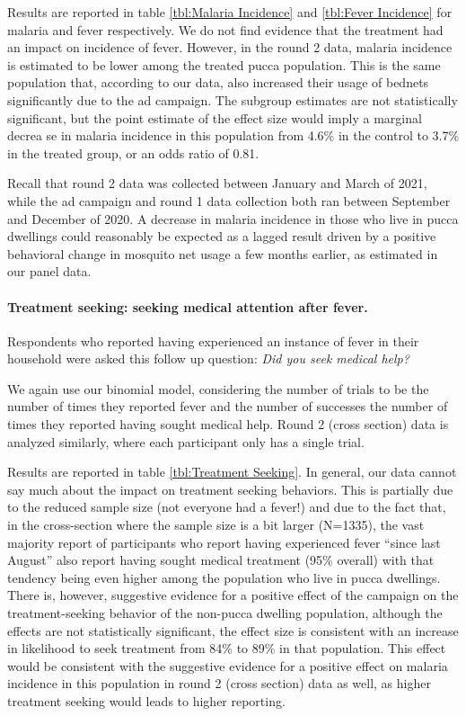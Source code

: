 \documentclass[a4paper,12pt]{article}
\begin{document}
Results are reported in table \ref{tbl:Malaria Incidence} and \ref{tbl:Fever Incidence} for malaria and fever respectively. We do not find evidence that the treatment had an impact on incidence of fever. However, in the round 2 data, malaria incidence is estimated to be lower among the treated pucca population. This is the same population that, according to our data, also increased their usage of bednets significantly due to the ad campaign. The subgroup estimates are not statistically significant, but the point estimate of the effect size would imply a marginal decrea
se in malaria incidence in this population from 4.6\% in the control to 3.7\% in the treated group, or an odds ratio of 0.81.

Recall that round 2 data was collected between January and March of 2021, while the ad campaign and round 1 data collection both ran between September and December of 2020. A decrease in malaria incidence in those who live in pucca dwellings could reasonably be expected as a lagged result driven by a positive behavioral change in mosquito net usage a few months earlier, as estimated in our panel data.




\paragraph{Treatment seeking: seeking medical attention after fever.} Respondents who reported having experienced an instance of fever in their household were asked this follow up question: \textit{Did you seek medical help?}

We again use our binomial model, considering the number of trials to be the number of times they reported fever and the number of successes the number of times they reported having sought medical help. Round 2 (cross section) data is analyzed similarly, where each participant only has a single trial.

Results are reported in table \ref{tbl:Treatment Seeking}. In general, our data cannot say much about the impact on treatment seeking behaviors. This is partially due to the reduced sample size (not everyone had a fever!) and due to the fact that, in the cross-section where the sample size is a bit larger (N=1335), the vast majority report of participants who report having experienced fever ``since last August'' also report having sought medical treatment (95\% overall) with that tendency being even higher among the population who live in pucca dwellings. There is, however, suggestive evidence for a positive effect of the campaign on the treatment-seeking behavior of the non-pucca dwelling population, although the effects are not statistically significant, the effect size is consistent with an increase in likelihood to seek treatment from 84\% to 89\% in that population. This effect would be consistent with the suggestive evidence for a positive effect on malaria incidence in this population in round 2 (cross section) data as well, as higher treatment seeking would leads to higher reporting.
\end{document}
